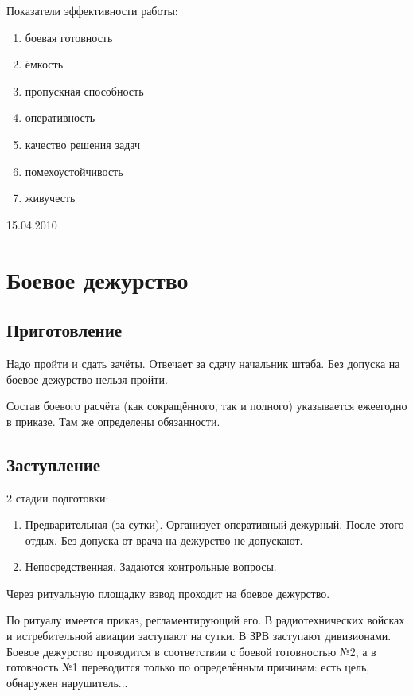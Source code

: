 \documentclass[a4paper,12pt]{article}
\begin{document}
	Показатели эффективности работы:
	\begin{enumerate}
		\item боевая готовность
		\item ёмкость
		\item пропускная способность
		\item оперативность
		\item качество решения задач
		\item помехоустойчивость
		\item живучесть
	\end{enumerate}
	\newpage
	\centerline{15.04.2010}
	\section{\bf Боевое дежурство}
	\subsection{\bf Приготовление}
	Надо пройти и сдать зачёты. Отвечает за сдачу начальник штаба. Без допуска на боевое 
дежурство нельзя пройти.

	Состав боевого расчёта (как сокращённого, так и полного) указывается ежеегодно в приказе. 
Там же определены обязанности.
	\subsection{\bf Заступление}
	2 стадии подготовки:
	\begin{enumerate}
		\item Предварительная (за сутки). Организует оперативный дежурный. После этого отдых.
		Без допуска от врача на дежурство не допускают.
		\item Непосредственная. Задаются контрольные вопросы.
	\end{enumerate}
	Через ритуальную площадку взвод проходит на боевое дежурство.
	
	По ритуалу имеется приказ, регламентирующий его. В радиотехнических войсках и истребительной
авиации заступают на сутки. В ЗРВ заступают дивизионами. Боевое дежурство проводится в
соответствии с боевой готовностью №2, а в готовность №1 переводится только по определённым
причинам: есть цель, обнаружен нарушитель...
\end{document}

